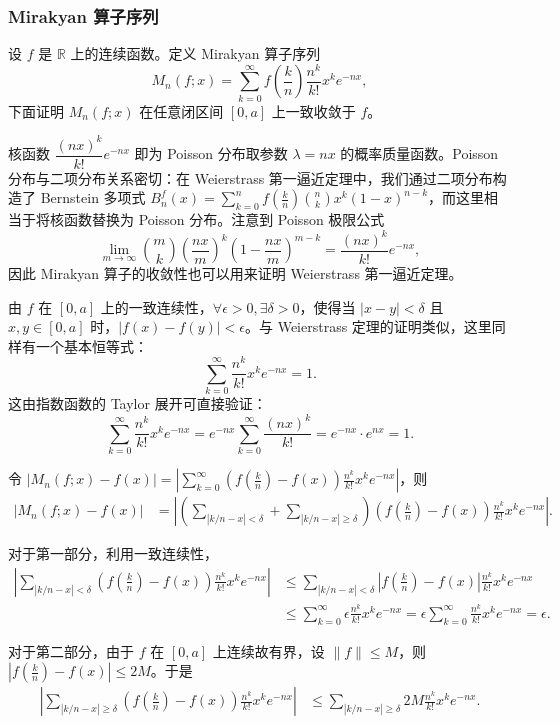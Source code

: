 \subsubsection{Mirakyan 算子序列}

设 $f$ 是 $\mathbb{R}$ 上的连续函数。定义 Mirakyan 算子序列
\[
M_n(f;x) = \sum_{k=0}^{\infty} f\left(\frac{k}{n}\right) \frac{n^k}{k!} x^k e^{-nx},
\]
下面证明 $M_n(f;x)$ 在任意闭区间 $[0, a]$ 上一致收敛于 $f$。

核函数 $\dfrac{(nx)^k}{k!}e^{-nx}$ 即为 Poisson 分布取参数 $\lambda = nx$ 的概率质量函数。Poisson 分布与二项分布关系密切：在 Weierstrass 第一逼近定理中，我们通过二项分布构造了 Bernstein 多项式 $B_n^f(x) = \sum_{k=0}^{n} f(\frac{k}{n}) \binom{n}{k} x^k (1-x)^{n-k}$，而这里相当于将核函数替换为 Poisson 分布。注意到 Poisson 极限公式
\[
\lim_{m \to \infty} \binom{m}{k} \left(\frac{nx}{m}\right)^k \left(1 - \frac{nx}{m}\right)^{m-k} = \frac{(nx)^k}{k!} e^{-nx},
\]
因此 Mirakyan 算子的收敛性也可以用来证明 Weierstrass 第一逼近定理。

由 $f$ 在 $[0,a]$ 上的一致连续性，$\forall \epsilon >0,\exists \delta>0$，使得当 $|x-y|<\delta$ 且 $x,y \in [0,a]$ 时，$|f(x)-f(y)|<\epsilon$。与 Weierstrass 定理的证明类似，这里同样有一个基本恒等式：
\[
\sum_{k=0}^{\infty} \frac{n^k}{k!} x^k e^{-nx} = 1.
\]
这由指数函数的 Taylor 展开可直接验证：
\[
\sum_{k=0}^{\infty} \frac{n^k}{k!} x^k e^{-nx}
= e^{-nx} \sum_{k=0}^{\infty} \frac{(nx)^k}{k!}
= e^{-nx} \cdot e^{nx} = 1.
\]

令 $|M_n(f;x)-f(x)| = \left|\sum_{k=0}^{\infty} \left(f\left(\frac{k}{n}\right) - f(x)\right)\frac{n^k}{k!} x^k e^{-nx}\right|$，则
\begin{align*}
|M_n(f;x)-f(x)|
&= \left| \left(\sum_{|k/n - x| < \delta} + \sum_{|k/n - x| \geq \delta}\right) \left(f\left(\frac{k}{n}\right) - f(x)\right) \frac{n^k}{k!} x^k e^{-nx} \right|.
\end{align*}

对于第一部分，利用一致连续性，
\begin{align*}
\left| \sum_{|k/n - x| < \delta} \left(f\left(\frac{k}{n}\right) - f(x)\right) \frac{n^k}{k!} x^k e^{-nx} \right|
&\leq \sum_{|k/n - x| < \delta} \left| f\left(\frac{k}{n}\right) - f(x) \right| \frac{n^k}{k!} x^k e^{-nx} \\
&\leq \sum_{k=0}^{\infty} \epsilon \frac{n^k}{k!} x^k e^{-nx}
= \epsilon \sum_{k=0}^{\infty} \frac{n^k}{k!} x^k e^{-nx} = \epsilon.
\end{align*}

对于第二部分，由于 $f$ 在 $[0,a]$ 上连续故有界，设 $\|f\| \leq M$，则 $|f(\frac{k}{n}) - f(x)| \leq 2M$。于是
\begin{align*}
\left| \sum_{|k/n - x| \geq \delta} \left(f\left(\frac{k}{n}\right) - f(x)\right) \frac{n^k}{k!} x^k e^{-nx} \right|
&\leq \sum_{|k/n - x| \geq \delta} 2M \frac{n^k}{k!} x^k e^{-nx}.
\end{align*}

